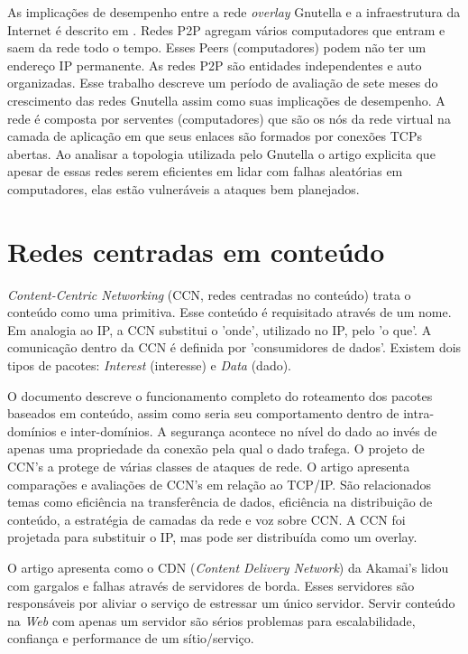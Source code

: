 As implicações de desempenho entre a rede \emph{overlay} Gnutella e a
infraestrutura da Internet é descrito em \citep{ripeanu2002mapping}.
Redes P2P agregam vários computadores que entram e saem da rede todo o tempo.
Esses Peers (computadores) podem não ter um endereço IP permanente.
As redes P2P são entidades independentes e auto organizadas.
Esse trabalho descreve um período de avaliação de sete meses do crescimento das
redes Gnutella assim como suas implicações de desempenho.
A rede é composta por serventes (computadores) que são os nós da rede virtual
na camada de aplicação em que seus enlaces são formados por conexões
TCPs abertas.
Ao analisar a topologia utilizada pelo Gnutella o artigo explicita que apesar
de essas redes serem eficientes em lidar com falhas aleatórias em computadores,
elas estão vulneráveis a ataques bem planejados.

\section{Redes centradas em conteúdo}

\emph{Content-Centric Networking} (CCN, redes centradas no conteúdo) trata o
conteúdo como uma primitiva\citep{van2009networking}.
Esse conteúdo é requisitado através de um nome.
Em analogia ao IP, a CCN substitui o 'onde', utilizado no IP, pelo 'o que'.
A comunicação dentro da CCN é definida por 'consumidores de dados'.
Existem dois tipos de pacotes: \emph{Interest} (interesse)
e \emph{Data} (dado).

O documento descreve o funcionamento completo do roteamento dos pacotes
baseados em conteúdo, assim como seria seu comportamento dentro de
intra-domínios e inter-domínios.
A segurança acontece no nível do dado ao invés de apenas uma propriedade da
conexão pela qual o dado trafega.
O projeto de CCN's a protege de várias classes de ataques de rede.
O artigo apresenta comparações e avaliações de CCN's em relação ao TCP/IP.
São relacionados temas como eficiência na transferência de dados,
eficiência na distribuição de conteúdo, a estratégia de camadas da rede
e voz sobre CCN.
A CCN foi projetada para substituir o IP, mas pode ser distribuída
como um overlay.

O artigo \citep{dilley2002globally} apresenta como o CDN
(\emph{Content Delivery Network}) da Akamai's lidou com gargalos e falhas
através de servidores de borda.
Esses servidores são responsáveis por aliviar o serviço de estressar um único
servidor.
Servir conteúdo na \emph{Web} com apenas um servidor são sérios problemas
para escalabilidade, confiança e performance de um sítio/serviço.

